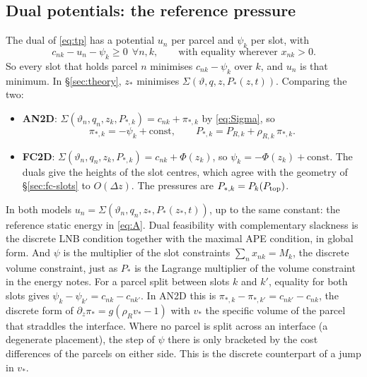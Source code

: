 \documentclass[11pt,a4paper]{article}
\newcommand{\vt}{\vartheta}
\newcommand{\Ptop}{P_{\rm top}}
\newcommand{\zs}{z_{*}}
\begin{document}
\subsection{Dual potentials: the reference pressure}\label{sec:dual}
The dual of \eqref{eq:tp} has a potential $u_n$ per parcel and $\psi_k$ per slot, with
\begin{equation}
  c_{nk}-u_n-\psi_k\ge0\ \ \forall n,k,\qquad\text{with equality wherever }x_{nk}>0 .
  \label{eq:dual}
\end{equation}
So every slot that holds parcel $n$ minimises $c_{nk}-\psi_k$ over $k$, and $u_n$ is that minimum. In \S\ref{sec:theory},
$\zs$ minimises $\Sigma(\vt,q,z,P_*(z,t))$. Comparing the two:
\begin{itemize}
  \item \textbf{AN2D}: $\Sigma(\vt_n,q_n,z_k,P_{*,k})=c_{nk}+\pi_{*,k}$ by \eqref{eq:Sigma}, so
        \begin{equation}
          \pi_{*,k}=-\psi_k+\text{const},\qquad P_{*,k}=P_{R,k}+\rho_{R,k}\,\pi_{*,k}.
        \end{equation}
  \item \textbf{FC2D}: $\Sigma(\vt_n,q_n,z_k,P_{*,k})=c_{nk}+\Phi(z_k)$, so $\psi_k=-\Phi(z_k)+\text{const}$. The duals give
        the heights of the slot centres, which agree with the geometry of \S\ref{sec:fc-slots} to $O(\Delta z)$. The
        pressures are $P_{*,k}=P_k(\Ptop)$.
\end{itemize}
In both models $u_n=\Sigma(\vt_n,q_n,\zs,P_*(\zs,t))$, up to the same constant: the reference static energy in \eqref{eq:A}.
Dual feasibility with complementary slackness is the discrete LNB condition together with the maximal APE condition, in global
form. And $\psi$ is the multiplier of the slot constraints $\sum_nx_{nk}=M_k$, the discrete volume constraint, just as $P_*$ is
the Lagrange multiplier of the volume constraint in the energy notes. For a parcel split between slots $k$ and $k'$, equality
for both slots gives $\psi_k-\psi_{k'}=c_{nk}-c_{nk'}$. In AN2D this is $\pi_{*,k}-\pi_{*,k'}=c_{nk'}-c_{nk}$, the discrete form
of $\partial_z\pi_*=g(\rho_Rv_*-1)$ with $v_*$ the specific volume of the parcel that straddles the interface. Where no parcel
is split across an interface (a degenerate placement), the step of $\psi$ there is only bracketed by the cost differences of the
parcels on either side. This is the discrete counterpart of a jump in $v_*$.
\end{document}
